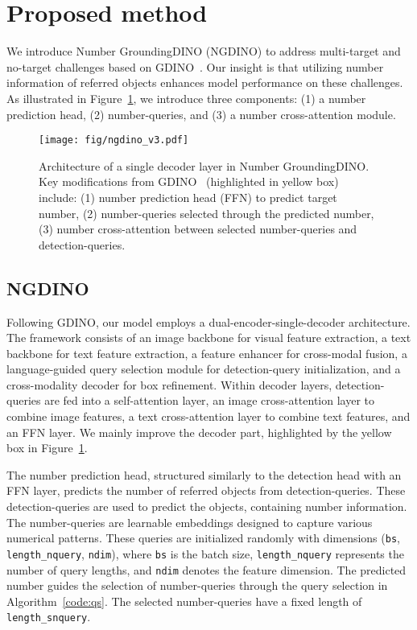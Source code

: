 \section{Proposed method}
We introduce Number GroundingDINO (NGDINO) to address multi-target and no-target challenges based on GDINO~\cite{gdino}. Our insight is that utilizing number information of referred objects enhances model performance on these challenges. As illustrated in Figure~\ref{fig:ngdino}, we introduce three components: (1) a number prediction head, (2) number-queries, and (3) a number cross-attention module.




\begin{figure}[t]
    \centering
    \texttt{[image: fig/ngdino\_v3.pdf]}
\caption{Architecture of a single decoder layer in Number GroundingDINO. Key modifications from GDINO~\cite{gdino} (highlighted in yellow box) include: (1) number prediction head (FFN) to predict target number, (2) number-queries selected through the predicted number, (3) number cross-attention between selected number-queries and detection-queries.}

    \label{fig:ngdino}
\end{figure}

\subsection{NGDINO}
Following GDINO, our model employs a dual-encoder-single-decoder architecture. The framework consists of an image backbone for visual feature extraction, a text backbone for text feature extraction, a feature enhancer for cross-modal fusion, a language-guided query selection module for detection-query initialization, and a cross-modality decoder for box refinement. Within decoder layers, detection-queries are fed into a self-attention layer, an image cross-attention layer to combine image features, a text cross-attention layer to combine text features, and an FFN layer. We mainly improve the decoder part, highlighted by the yellow box in Figure~\ref{fig:ngdino}.\par

The number prediction head, structured similarly to the detection head with an FFN layer, predicts the number of referred objects from detection-queries. These detection-queries are used to predict the objects, containing number information. The number-queries are learnable embeddings designed to capture various numerical patterns. These queries are initialized randomly with dimensions (\texttt{bs}, \texttt{length\_nquery}, \texttt{ndim}), where \texttt{bs} is the batch size, \texttt{length\_nquery} represents the number of query lengths, and \texttt{ndim} denotes the feature dimension. The predicted number guides the selection of number-queries through the query selection in Algorithm~\ref{code:qs}. The selected number-queries have a fixed length of \texttt{length\_snquery}.\par


